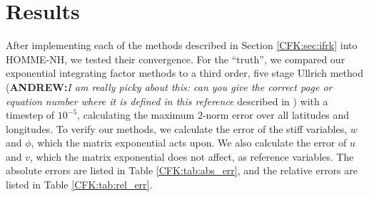\documentclass{csri19}
\newcommand{\A}[1]{\textbf{ANDREW:}\textit{#1}}
\begin{document}
\section{Results}\label{CFK:sec:results}
After implementing each of the methods described in Section 
\ref{CFK:sec:ifrk} into HOMME-NH, we tested their convergence. For the 
``truth'', we compared our exponential integrating factor methods to a 
third order, five stage Ullrich method (\A{I am really picky about this: can you give the correct page or equation number where it is defined in this reference} described in \cite{CFK:Guerra2016}) 
with a timestep of $10^{-5}$, calculating the maximum $2$-norm error over 
all latitudes and longitudes. To verify our methods, we calculate the error 
of the stiff variables, $w$ and $\phi$, which the matrix exponential acts 
upon. We also calculate the error of $u$ and $v$, which the matrix 
exponential does not affect, as reference variables. The absolute errors 
are listed in Table \ref{CFK:tab:abs_err}, and the relative errors are 
listed in Table \ref{CFK:tab:rel_err}.
\end{document}
